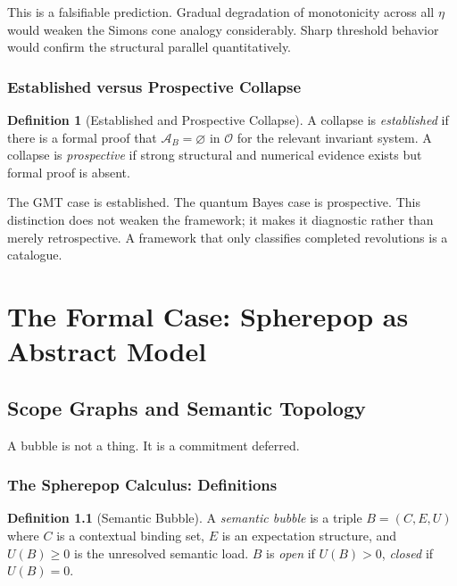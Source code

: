 \documentclass[12pt,oneside]{book}
\theoremstyle{plain}
\theoremstyle{definition}
\newtheorem{definition}[theorem]{Definition}
\theoremstyle{remark}
\newcommand{\Oold}{\mathcal{O}}
\newcommand{\Admiss}{\mathcal{A}}
\begin{document}
This is a falsifiable prediction. Gradual degradation of monotonicity across
all $\eta$ would weaken the Simons cone analogy considerably. Sharp threshold
behavior would confirm the structural parallel quantitatively.

\section{Established versus Prospective Collapse}

\begin{definition}[Established and Prospective Collapse]
A collapse is \emph{established} if there is a formal proof that
$\Admiss_B = \varnothing$ in $\Oold$ for the relevant invariant system.
A collapse is \emph{prospective} if strong structural and numerical evidence
exists but formal proof is absent.
\end{definition}

The GMT case is established. The quantum Bayes case is prospective.
This distinction does not weaken the framework; it makes it diagnostic
rather than merely retrospective. A framework that only classifies completed
revolutions is a catalogue.

\part{The Formal Case: Spherepop as Abstract Model}

\chapter{Scope Graphs and Semantic Topology}

\epigraph{A bubble is not a thing. It is a commitment deferred.}{}

\section{The Spherepop Calculus: Definitions}

\begin{definition}[Semantic Bubble]
A \emph{semantic bubble} is a triple $B = (C, E, U)$ where $C$ is a
contextual binding set, $E$ is an expectation structure, and $U(B) \geq 0$
is the unresolved semantic load. $B$ is \emph{open} if $U(B) > 0$,
\emph{closed} if $U(B) = 0$.
\end{definition}
\end{document}
